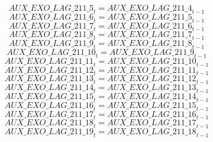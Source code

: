 \begin{dmath}
{AUX\_EXO\_LAG\_211\_5}_{t}={AUX\_EXO\_LAG\_211\_4}_{t-1}
\end{dmath}
\begin{dmath}
{AUX\_EXO\_LAG\_211\_6}_{t}={AUX\_EXO\_LAG\_211\_5}_{t-1}
\end{dmath}
\begin{dmath}
{AUX\_EXO\_LAG\_211\_7}_{t}={AUX\_EXO\_LAG\_211\_6}_{t-1}
\end{dmath}
\begin{dmath}
{AUX\_EXO\_LAG\_211\_8}_{t}={AUX\_EXO\_LAG\_211\_7}_{t-1}
\end{dmath}
\begin{dmath}
{AUX\_EXO\_LAG\_211\_9}_{t}={AUX\_EXO\_LAG\_211\_8}_{t-1}
\end{dmath}
\begin{dmath}
{AUX\_EXO\_LAG\_211\_10}_{t}={AUX\_EXO\_LAG\_211\_9}_{t-1}
\end{dmath}
\begin{dmath}
{AUX\_EXO\_LAG\_211\_11}_{t}={AUX\_EXO\_LAG\_211\_10}_{t-1}
\end{dmath}
\begin{dmath}
{AUX\_EXO\_LAG\_211\_12}_{t}={AUX\_EXO\_LAG\_211\_11}_{t-1}
\end{dmath}
\begin{dmath}
{AUX\_EXO\_LAG\_211\_13}_{t}={AUX\_EXO\_LAG\_211\_12}_{t-1}
\end{dmath}
\begin{dmath}
{AUX\_EXO\_LAG\_211\_14}_{t}={AUX\_EXO\_LAG\_211\_13}_{t-1}
\end{dmath}
\begin{dmath}
{AUX\_EXO\_LAG\_211\_15}_{t}={AUX\_EXO\_LAG\_211\_14}_{t-1}
\end{dmath}
\begin{dmath}
{AUX\_EXO\_LAG\_211\_16}_{t}={AUX\_EXO\_LAG\_211\_15}_{t-1}
\end{dmath}
\begin{dmath}
{AUX\_EXO\_LAG\_211\_17}_{t}={AUX\_EXO\_LAG\_211\_16}_{t-1}
\end{dmath}
\begin{dmath}
{AUX\_EXO\_LAG\_211\_18}_{t}={AUX\_EXO\_LAG\_211\_17}_{t-1}
\end{dmath}
\begin{dmath}
{AUX\_EXO\_LAG\_211\_19}_{t}={AUX\_EXO\_LAG\_211\_18}_{t-1}
\end{dmath}
